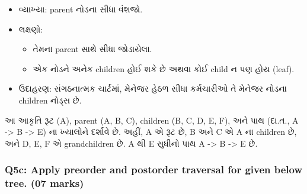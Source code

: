 \begin{enumerate}
  \begin{itemize}
  \tightlist
  \item
    વ્યાખ્યા: parent નોડના સીધા વંશજો.
  \item
    લક્ષણો:

    \begin{itemize}
    \tightlist
    \item
      તેમના parent સાથે સીધા જોડાયેલા.
    \item
      એક નોડને અનેક children હોઈ શકે છે અથવા કોઈ child ન પણ હોય (leaf).
    \end{itemize}
  \item
    ઉદાહરણ: સંગઠનાત્મક ચાર્ટમાં, મેનેજર હેઠળ સીધા કર્મચારીઓ તે મેનેજર નોડના
    children નોડ્સ છે.
  \end{itemize}
\end{enumerate}

\begin{Shaded}
\begin{Highlighting}[]
\end{Highlighting}
\end{Shaded}

આ આકૃતિ રૂટ (A), parent (A, B, C), children (B, C, D, E, F), અને પાથ
(દા.ત., A -\textgreater{} B -\textgreater{} E) ના ખ્યાલોને દર્શાવે છે. અહીં, A
એ રૂટ છે, B અને C એ A ના children છે, અને D, E, F એ grandchildren છે. A થી E
સુધીનો પાથ A -\textgreater{} B -\textgreater{} E છે.

\hypertarget{q5c-apply-preorder-and-postorder-traversal-for-given-below-tree.-07-marks}{%
\subsubsection{Q5c: Apply preorder and postorder traversal for given
below tree. (07
marks)}\label{q5c-apply-preorder-and-postorder-traversal-for-given-below-tree.-07-marks}}

\begin{Shaded}
\begin{Highlighting}[]
    
\end{Highlighting}
\end{Shaded}

